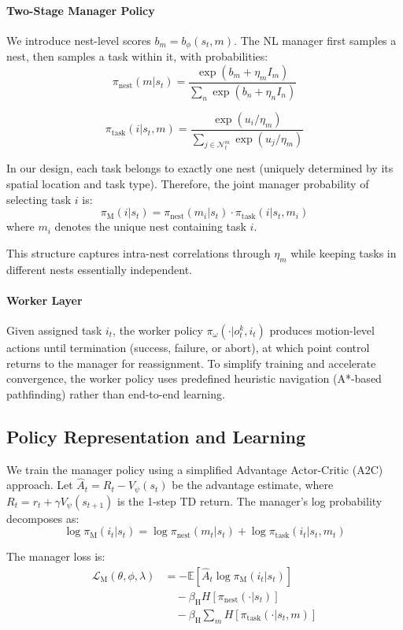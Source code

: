 \documentclass[12pt,a4paper]{article}
\begin{document}
\paragraph{Two-Stage Manager Policy}

We introduce nest-level scores $b_m = b_\phi(s_t, m)$. The NL manager first samples a nest, then samples a task within it, with probabilities:
\[\pi_{\mathrm{nest}}(m | s_t) = \frac{\exp(b_m + \eta_m I_m)}{\sum_n \exp(b_n + \eta_n I_n)}\]

\[\pi_{\mathrm{task}}(i | s_t, m) = \frac{\exp(u_i / \eta_m)}{\sum_{j \in \mathcal{N}^m_t} \exp(u_j / \eta_m)}\]

In our design, each task belongs to exactly one nest (uniquely determined by its spatial location and task type). Therefore, the joint manager probability of selecting task $i$ is:
\[\pi_{\mathrm{M}}(i | s_t) = \pi_{\mathrm{nest}}(m_i | s_t) \cdot \pi_{\mathrm{task}}(i | s_t, m_i)\]
where $m_i$ denotes the unique nest containing task $i$.

This structure captures intra-nest correlations through $\eta_m$ while keeping tasks in different nests essentially independent.

\paragraph{Worker Layer}

Given assigned task $i_t$, the worker policy $\pi_\omega(\cdot | o^k_t, i_t)$ produces motion-level actions until termination (success, failure, or abort), at which point control returns to the manager for reassignment. To simplify training and accelerate convergence, the worker policy uses predefined heuristic navigation (A*-based pathfinding) rather than end-to-end learning.

\subsection{Policy Representation and Learning}

We train the manager policy using a simplified Advantage Actor-Critic (A2C) approach. Let $\hat{A}_t = R_t - V_\psi(s_t)$ be the advantage estimate, where $R_t = r_t + \gamma V_\psi(s_{t+1})$ is the 1-step TD return. The manager's log probability decomposes as:
\[\log \pi_{\mathrm{M}}(i_t | s_t) = \log \pi_{\mathrm{nest}}(m_t | s_t) + \log \pi_{\mathrm{task}}(i_t | s_t, m_t)\]

The manager loss is:
\begin{align*}
\mathcal{L}_{\mathrm{M}}(\theta, \phi, \lambda) &= -\mathbb{E}[\hat{A}_t \log \pi_{\mathrm{M}}(i_t | s_t)] \\
&\quad - \beta_{\mathrm{H}} H[\pi_{\mathrm{nest}}(\cdot | s_t)] \\
&\quad - \beta_{\mathrm{H}} \sum_m H[\pi_{\mathrm{task}}(\cdot | s_t, m)]
\end{align*}
\end{document}

